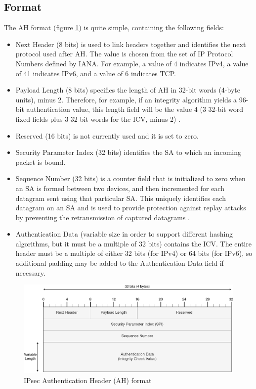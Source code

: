 \documentclass[a4paper,12pt]{report}
\begin{document}
		\subsection{Format}
		The AH format (figure \ref{ah_header}) is quite simple, containing the following fields:
	\begin{itemize}
	\item Next Header (8 bits) is used to link headers together and identifies the next protocol used after AH. The value is chosen from the set of IP Protocol Numbers defined by IANA. For example, a value of 4 indicates IPv4, a value of 41 indicates IPv6, and a value of 6 indicates TCP.
	\item Payload Length (8 bits) specifies the length of AH in 32-bit words (4-byte units), minus 2. Therefore, for example,  if an integrity algorithm yields a 96-bit authentication value, this length field will be the value 4 (3 32-bit word fixed fields plus 3 32-bit words for the ICV, minus 2) \cite{rfc4302}.
	\item Reserved (16 bits) is not currently used and it is set to zero. 
	\item Security Parameter Index (32 bits) identifies the SA to which an incoming packet is bound.
	\item Sequence Number (32 bits) is a counter field that is initialized to zero when an SA is formed between two devices, and then incremented for each datagram sent using that particular SA. This uniquely identifies each datagram on an SA and is used to provide protection against replay attacks by preventing the retransmission of captured datagrams \cite{kozierok2005tcp}.
	\item Authentication Data (variable size in order to support different hashing algorithms, but it must be a multiple of 32 bits) contains the ICV. The entire header must be a multiple of either 32 bits (for IPv4) or 64 bits (for IPv6), so additional padding may be added to the Authentication Data field if necessary.
\end{itemize}			
		
		\begin{figure}[h]
			\includegraphics[width=\textwidth]{ah_header}
			\centering
			\caption{IPsec Authentication Header (AH) format}
			\label{ah_header}
		\end{figure}
		
\end{document}
